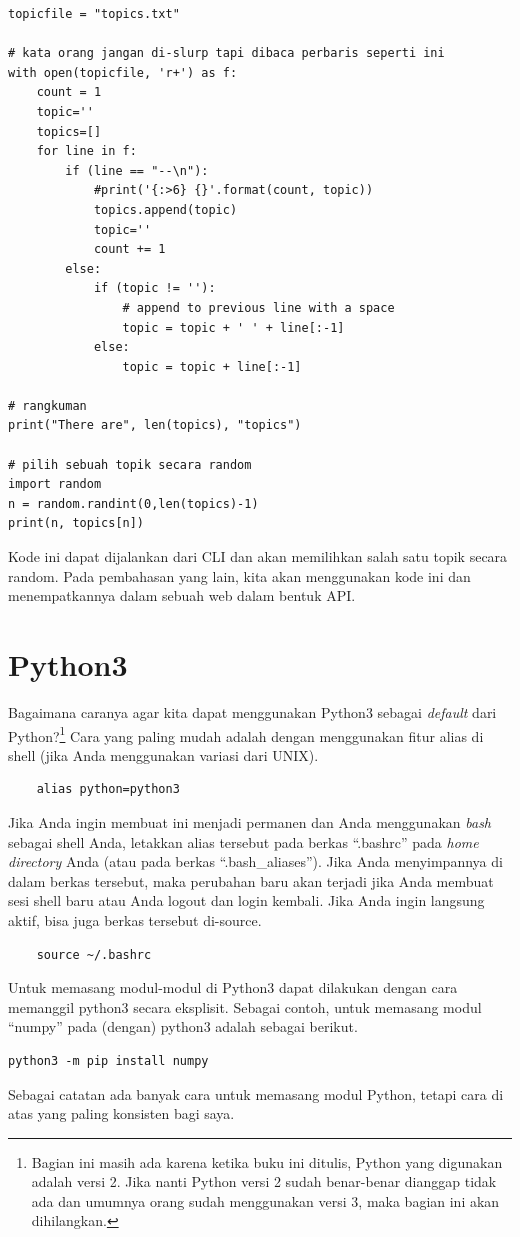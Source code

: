 \begin{verbatim}
topicfile = "topics.txt"

# kata orang jangan di-slurp tapi dibaca perbaris seperti ini
with open(topicfile, 'r+') as f:
    count = 1 
    topic=''
    topics=[]
    for line in f:
        if (line == "--\n"):
            #print('{:>6} {}'.format(count, topic))
            topics.append(topic)
            topic=''
            count += 1
        else:
            if (topic != ''):
                # append to previous line with a space
                topic = topic + ' ' + line[:-1]
            else:
                topic = topic + line[:-1] 

# rangkuman
print("There are", len(topics), "topics")

# pilih sebuah topik secara random
import random
n = random.randint(0,len(topics)-1)
print(n, topics[n])
\end{verbatim}

Kode ini dapat dijalankan dari CLI dan akan memilihkan salah satu
topik secara random.
Pada pembahasan yang lain, kita akan menggunakan kode ini dan
menempatkannya dalam sebuah web dalam bentuk API.

\section{Python3}
Bagaimana caranya agar kita dapat menggunakan Python3 sebagai {\em default}
dari Python?\footnote{Bagian ini masih ada karena ketika buku ini ditulis,
Python yang digunakan adalah versi 2. Jika nanti Python versi 2 sudah
benar-benar dianggap tidak ada dan umumnya orang sudah menggunakan
versi 3, maka bagian ini akan dihilangkan.}
Cara yang paling mudah adalah dengan menggunakan fitur
alias di shell (jika Anda menggunakan variasi dari UNIX).

\begin{verbatim}
    alias python=python3
\end{verbatim}

Jika Anda ingin membuat ini menjadi permanen dan Anda menggunakan {\em bash}
sebagai shell Anda, letakkan alias tersebut pada berkas ``.bashrc'' pada
{\em home directory} Anda (atau pada berkas ``.bash\_aliases''). 
Jika Anda menyimpannya di dalam berkas tersebut, maka perubahan baru akan 
terjadi jika Anda membuat sesi shell baru atau Anda logout dan login kembali.
Jika Anda ingin langsung aktif, bisa juga berkas tersebut di-source.

\begin{verbatim}
    source ~/.bashrc
\end{verbatim}
    
Untuk memasang modul-modul di Python3 dapat dilakukan dengan cara
memanggil python3 secara eksplisit. Sebagai contoh, untuk memasang
modul ``numpy'' pada (dengan) python3 adalah sebagai berikut.

\begin{verbatim}
python3 -m pip install numpy
\end{verbatim}

Sebagai catatan ada banyak cara untuk memasang modul Python, tetapi
cara di atas yang paling konsisten bagi saya.
